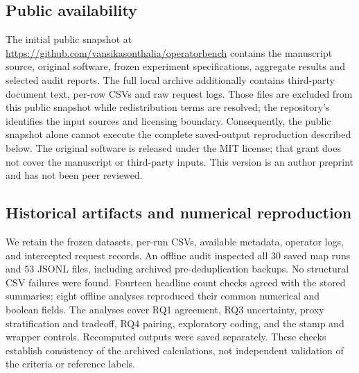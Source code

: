 \documentclass[11pt]{article}
\begin{document}
\subsection{Public availability}
The initial public snapshot at
\url{https://github.com/vansikasonthalia/operatorbench} contains the manuscript
source, original software, frozen experiment specifications, aggregate results
and selected audit reports. The full local archive additionally contains
third-party document text, per-row CSVs and raw request logs. Those files are
excluded from this public snapshot while redistribution terms are resolved;
the repository's  identifies the input sources and licensing
boundary. Consequently, the public snapshot alone cannot execute the complete
saved-output reproduction described below. The original software is released
under the MIT license; that grant does not cover the manuscript or third-party
inputs. This version is an author preprint and has not been peer reviewed.

\subsection{Historical artifacts and numerical reproduction}
We retain the frozen datasets, per-run CSVs, available metadata, operator logs,
and intercepted request records. An offline audit inspected all 30 saved map
runs and 53 JSONL files, including archived pre-deduplication backups. No
structural CSV failures were found. Fourteen headline count checks agreed with
the stored summaries; eight offline analyses reproduced their common numerical
and boolean fields. The analyses cover RQ1 agreement, RQ3 uncertainty, proxy
stratification and tradeoff, RQ4 pairing, exploratory coding, and the stamp and
wrapper controls. Recomputed outputs were saved separately. These checks
establish consistency of the archived calculations, not independent validation
of the criteria or reference labels.
\end{document}
